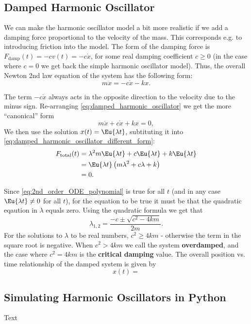 \subsection{Damped Harmonic Oscillator}
We can make the harmonic oscillator model a bit more realistic if we add a damping force proportional to the velocity of the mass. This corresponds e.g. to introducing friction into the model. The form of the damping force is $F_{\text{damp}}(t)=-cv(t)=-c\dot{x}$, for some real damping coefficient $c\geq0$ (in the case where $c=0$ we get back the simple harmonic oscillator model). Thus, the overall Newton 2nd law equation of the system has the following form:
\begin{equation}
  m\ddot{x} = -c\dot{x}-kx.
  \label{eq:damped_harmonic_oscillator}
\end{equation}

The term $-c\dot{x}$ always acts in the opposite direction to the velocity due to the minus sign. Re-arranging \autoref{eq:damped_harmonic_oscillator} we get the more \enquote{canonical} form
\begin{equation}
  m\ddot{x} + c\dot{x} + kx = 0,
  \label{eq:damped_harmonic_oscillator_different_form}
\end{equation}
We then use the solution $x(t)=\Eu{\lambda t}$, subtituting it into \autoref{eq:damped_harmonic_oscillator_different_form}:
\begin{align}
  F_{\text{total}}(t) &= \lambda^{2}m\Eu{\lambda t} + c\Eu{\lambda t} + k\Eu{\lambda t}\\
  &= \Eu{\lambda t}\left(m\lambda^{2}+c\lambda+k\right)\\
  &= 0.
  \label{eq:2nd_order_ODE_polynomial}
\end{align}

Since \autoref{eq:2nd_order_ODE_polynomial} is true for all $t$ (and in any case $\Eu{\lambda t}\neq 0$ for all $t$), for the equation to be true it must be that the quadratic eqaution in $\lambda$ equals zero. Using the quadratic formula we get that
\begin{equation}
  \lambda_{1,2} = \frac{-c\pm\sqrt{c^{2}-4km}}{2m}.
  \label{eq:2nd_order_ODE_polynomial_solution}
\end{equation}
For the solutions to $\lambda$ to be real numbers, $c^{2}\geq4km$ - otherwise the term in the square root is negative. When $c^{2}>4km$ we call the system \textbf{overdamped}, and the case where $c^{2}=4km$ is the \textbf{critical damping} value. The overall position vs. time relationship of the damped system is given by
\begin{equation}
  x(t) = 
  \label{eq:label}
\end{equation}

\subsection{Simulating Harmonic Oscillators in Python}
Text
